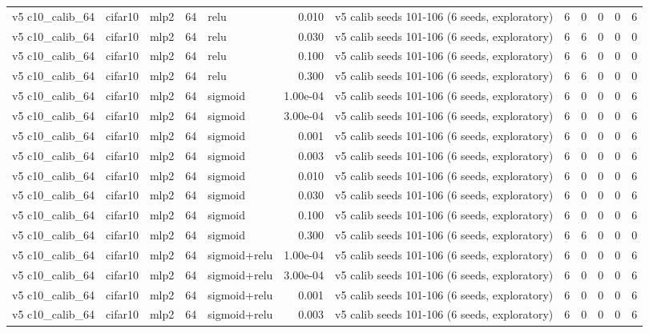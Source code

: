 \begin{table}[htbp]
{\begin{tabular}{@{}lllrlrlrrrrr@{}}
v5 c10\_calib\_64 & cifar10 & mlp2 & 64 & relu & 0.010 & v5 calib seeds 101-106 (6 seeds, exploratory) & 6 & 0 & 0 & 0 & 6 \\
v5 c10\_calib\_64 & cifar10 & mlp2 & 64 & relu & 0.030 & v5 calib seeds 101-106 (6 seeds, exploratory) & 6 & 6 & 0 & 0 & 0 \\
v5 c10\_calib\_64 & cifar10 & mlp2 & 64 & relu & 0.100 & v5 calib seeds 101-106 (6 seeds, exploratory) & 6 & 6 & 0 & 0 & 0 \\
v5 c10\_calib\_64 & cifar10 & mlp2 & 64 & relu & 0.300 & v5 calib seeds 101-106 (6 seeds, exploratory) & 6 & 6 & 0 & 0 & 0 \\
v5 c10\_calib\_64 & cifar10 & mlp2 & 64 & sigmoid & 1.00e-04 & v5 calib seeds 101-106 (6 seeds, exploratory) & 6 & 0 & 0 & 0 & 6 \\
v5 c10\_calib\_64 & cifar10 & mlp2 & 64 & sigmoid & 3.00e-04 & v5 calib seeds 101-106 (6 seeds, exploratory) & 6 & 0 & 0 & 0 & 6 \\
v5 c10\_calib\_64 & cifar10 & mlp2 & 64 & sigmoid & 0.001 & v5 calib seeds 101-106 (6 seeds, exploratory) & 6 & 0 & 0 & 0 & 6 \\
v5 c10\_calib\_64 & cifar10 & mlp2 & 64 & sigmoid & 0.003 & v5 calib seeds 101-106 (6 seeds, exploratory) & 6 & 0 & 0 & 0 & 6 \\
v5 c10\_calib\_64 & cifar10 & mlp2 & 64 & sigmoid & 0.010 & v5 calib seeds 101-106 (6 seeds, exploratory) & 6 & 0 & 0 & 0 & 6 \\
v5 c10\_calib\_64 & cifar10 & mlp2 & 64 & sigmoid & 0.030 & v5 calib seeds 101-106 (6 seeds, exploratory) & 6 & 0 & 0 & 0 & 6 \\
v5 c10\_calib\_64 & cifar10 & mlp2 & 64 & sigmoid & 0.100 & v5 calib seeds 101-106 (6 seeds, exploratory) & 6 & 0 & 0 & 0 & 6 \\
v5 c10\_calib\_64 & cifar10 & mlp2 & 64 & sigmoid & 0.300 & v5 calib seeds 101-106 (6 seeds, exploratory) & 6 & 6 & 0 & 0 & 0 \\
v5 c10\_calib\_64 & cifar10 & mlp2 & 64 & sigmoid+relu & 1.00e-04 & v5 calib seeds 101-106 (6 seeds, exploratory) & 6 & 0 & 0 & 0 & 6 \\
v5 c10\_calib\_64 & cifar10 & mlp2 & 64 & sigmoid+relu & 3.00e-04 & v5 calib seeds 101-106 (6 seeds, exploratory) & 6 & 0 & 0 & 0 & 6 \\
v5 c10\_calib\_64 & cifar10 & mlp2 & 64 & sigmoid+relu & 0.001 & v5 calib seeds 101-106 (6 seeds, exploratory) & 6 & 0 & 0 & 0 & 6 \\
v5 c10\_calib\_64 & cifar10 & mlp2 & 64 & sigmoid+relu & 0.003 & v5 calib seeds 101-106 (6 seeds, exploratory) & 6 & 0 & 0 & 0 & 6 \\

\end{tabular}}
\end{table}
